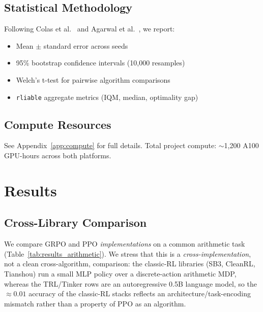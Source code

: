 \documentclass[manuscript,review,anonymous]{acmart}
\begin{document}
\subsection{Statistical Methodology}

Following Colas et al.~\cite{colas2019hitchhiker} and Agarwal et al.~\cite{agarwal2021deep}, we report:
\begin{itemize}
    \item Mean $\pm$ standard error across seeds
    \item 95\% bootstrap confidence intervals (10,000 resamples)
    \item Welch's t-test for pairwise algorithm comparisons
    \item \texttt{rliable} aggregate metrics (IQM, median, optimality gap)
\end{itemize}

\subsection{Compute Resources}

See Appendix~\ref{app:compute} for full details. Total project compute:
$\sim$1,200 A100 GPU-hours across both platforms.

\section{Results}
\label{sec:results}

\subsection{Cross-Library Comparison}

We compare GRPO and PPO \emph{implementations} on a common arithmetic task
(Table~\ref{tab:results_arithmetic}). We stress that this is a
\emph{cross-implementation}, not a clean cross-algorithm, comparison: the
classic-RL libraries (SB3, CleanRL, Tianshou) run a small MLP policy over a
discrete-action arithmetic MDP, whereas the TRL/Tinker rows are an
autoregressive 0.5B language model, so the $\approx 0.01$ accuracy of the
classic-RL stacks reflects an architecture/task-encoding mismatch rather than a
property of PPO as an algorithm.
\end{document}
